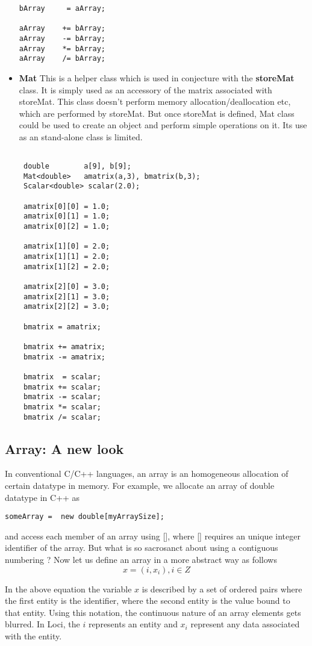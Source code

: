 \begin{itemize}
\begin{verbatim}
bArray     = aArray;

aArray    += bArray;
aArray    -= bArray;
aArray    *= bArray;
aArray    /= bArray;
\end{verbatim}

\item {\bf Mat} This is a helper class which is used in conjecture with the {\bf
storeMat} class. It is simply used as an accessory of the matrix associated
with storeMat. This class doesn't perform memory allocation/deallocation
etc, which are performed by storeMat. But once storeMat is defined, Mat class
could be used to create an object and perform simple operations on it. Its
use as an stand-alone class is limited.

\begin{verbatim}

 double        a[9], b[9];
 Mat<double>   amatrix(a,3), bmatrix(b,3);
 Scalar<double> scalar(2.0);

 amatrix[0][0] = 1.0;
 amatrix[0][1] = 1.0;
 amatrix[0][2] = 1.0;

 amatrix[1][0] = 2.0;
 amatrix[1][1] = 2.0;
 amatrix[1][2] = 2.0;

 amatrix[2][0] = 3.0;
 amatrix[2][1] = 3.0;
 amatrix[2][2] = 3.0;

 bmatrix = amatrix;

 bmatrix += amatrix;
 bmatrix -= amatrix;

 bmatrix  = scalar;
 bmatrix += scalar;
 bmatrix -= scalar;
 bmatrix *= scalar;
 bmatrix /= scalar;
\end{verbatim}
\end{itemize}

\subsection { Array: A new look}
\par In conventional C/C++ languages, an array is an homogeneous allocation
of certain datatype in memory. For example, we allocate an array of double
datatype in C++ as
%
\begin{verbatim}
someArray =  new double[myArraySize];
\end{verbatim}
and access each member of an array using [], where [] requires an unique integer 
identifier of the array. But what is so sacrosanct about using a contiguous
numbering ? Now let us define an array in a more abstract way as follows
%
\begin{equation}
   x = {(i,x_i), i \in Z }
\end{equation}
\par In the above equation the variable $x$ is described by a set of 
ordered pairs where the first entity is the identifier, where the second
entity is the value bound to that entity. Using this notation, the 
continuous nature of an array elements gets blurred.  In Loci, the 
$i$ represents an entity and $x_i$ represent any data associated with
the entity.
%

